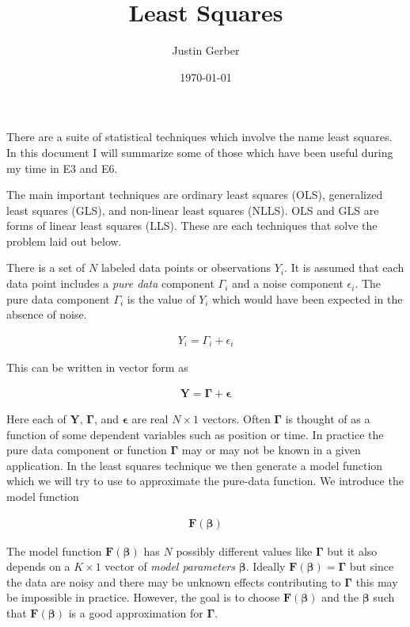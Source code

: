 \documentclass[12pt]{article}
\newcommand{\ep}{\epsilon}
\newcommand{\bv}[1]{\boldsymbol{#1}}
\begin{document}
\title{Least Squares}
\author{Justin Gerber}
\date{\today}
\maketitle

There are a suite of statistical techniques which involve the name least squares. 
In this document I will summarize some of those which have been useful during my time in E3 and E6.

The main important techniques are ordinary least squares (OLS), generalized least squares (GLS), and non-linear least squares (NLLS). 
OLS and GLS are forms of linear least squares (LLS).
These are each techniques that solve the problem laid out below. 

There is a set of $N$ labeled data points or observations $Y_i$. 
It is assumed that each data point includes a \textit{pure data} component $\Gamma_i$ and a noise component $\ep_i$.
The pure data component $\Gamma_i$ is the value of $Y_i$ which would have been expected in the absence of noise.

\begin{align}
Y_i = \Gamma_i + \ep_i
\end{align}

This can be written in vector form as

\begin{align}
\bv{Y} = \bv{\Gamma} + \bv{\ep}
\end{align}

Here each of $\bv{Y}$, $\bv{\Gamma}$, and $\bv{\ep}$ are real $N \times 1$ vectors.
Often $\bv{\Gamma}$ is thought of as a function of some dependent variables such as position or time. 
In practice the pure data component or function $\bv{\Gamma}$ may or may not be known in a given application. 
In the least squares technique we then generate a model function which we will try to use to approximate the pure-data function. 
We introduce the model function

\begin{align}
\bv{F}(\bv{\beta})
\end{align}

The model function $\bv{F}(\bv{\beta})$ has $N$ possibly different values like $\bv{\Gamma}$ but it also depends on a $K\times 1$ vector of \textit{model parameters} $\bv{\beta}$. 
Ideally $\bv{F}(\bv{\beta}) = \bv{\Gamma}$ but since the data are noisy and there may be unknown effects contributing to $\bv{\Gamma}$ this may be impossible in practice. 
However, the goal is to choose $\bv{F}(\bv{\beta})$ and the $\bv{\beta}$ such that $\bv{F}(\bv{\beta})$ is a good approximation for $\bv{\Gamma}$.
\end{document}
